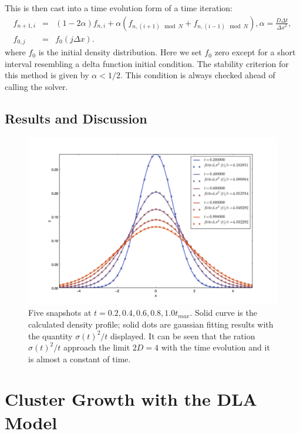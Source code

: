 \documentclass[a4paper,12pt]{article}
\begin{document}
This is then cast into a time evolution form of a time iteration:
\begin{eqnarray*}
f_{n+1,i} &=&  (1 - 2 \alpha) f_{n,i} + \alpha (f_{n, (i+1)\mod N}+f_{n, (i-1)\mod N}), \alpha = \frac{D\Delta t}{{\Delta x}^2},\\
f_{0,j} &=& f_0(j\Delta x).
\end{eqnarray*}
where $f_0$ is the initial density distribution. Here we set $f_0$ zero except for a short interval resembling a delta function initial condition. The stability criterion for this method is given by $\alpha < 1/2$. This condition is always checked ahead of calling the solver. 

\subsection{Results and Discussion}
\begin{figure}[htbp]
\begin{center}
\includegraphics[width = \textwidth]{pics/diffusion_snapshot.jpeg}
\caption{Five snapshots at $t = 0.2, 0.4, 0.6, 0.8, 1.0 t_{max}$. Solid curve is the calculated density profile; solid dots are gaussian fitting results with the quantity $\sigma(t)^2/t$ displayed. It can be seen that the ration $\sigma(t)^2/t$ approach the limit $2D = 4$ with the time evolution and it is almost a constant of time.}
\label{default}
\end{center}
\end{figure}



\section{Cluster Growth with the DLA Model}
\end{document}
